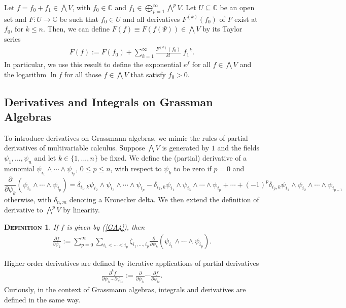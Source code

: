 \documentclass[12pt,twoside]{amsart}
\newcommand{\beq}{\begin{equation}}
\newcommand{\eeq}{\end{equation}}
\newtheorem{defi}{\textsc{Definition}}[section]
\numberwithin{equation}{section}
\begin{document}
Let $f = f_{0}+ f_{1} \in \bigwedge V$, with $f_{0} \in \mathbb{C}$ and $f_{1} \in \bigoplus_{p=1}^{\infty}\bigwedge^{p}V$. Let $U \subseteq \mathbb{C}$ be an open set and $F: U \to \mathbb{C}$ be such that $f_{0} \in U$ and all derivatives $F^{(k)}(f_{0})$ of $F$ exist at $f_{0}$, for $k \le n$. Then, we can define $F(f) \equiv F(f(\Psi)) \in \bigwedge V$ by its Taylor series
\begin{eqnarray}
F(f) := F(f_{0}) + \sum_{k=1}^{\infty}\frac{F^{(k)}(f_{0})}{k!}\;{f_1}^{k}. \label{GA8}
\end{eqnarray}
In particular, we use this result to define the exponential $e^{f}$ for all $f \in \bigwedge V$ and the logarithm $\ln f$ for all those $f \in \bigwedge V$ that satisfy $f_0 > 0$. 

\subsection{Derivatives and Integrals on Grassman Algebras}\label{derivativesandintegrals}

To introduce derivatives on Grassmann algebras, we mimic the rules of partial derivatives of multivariable calculus. Suppose $\bigwedge V$ is generated by $1$ and the fields $\psi_{1},...,\psi_{n}$ and let $k \in \{1,...,n\}$ be fixed. We define the (partial) derivative of a monomial $\psi_{i_{1}}\wedge \cdots \wedge \psi_{i_{p}}$, $0 \le p \le n$, with respect to $\psi_{k}$ to be zero if $p=0$ and 
\beq
\frac{\partial}{\partial \psi_{k}}(\psi_{i_{1}}\wedge \cdots \wedge \psi_{i_{p}}) = \delta_{i_{1},k}\psi_{i_{2}}\wedge \psi_{i_{3}}\wedge  \cdots \wedge \psi_{i_{p}} -\delta_{i_{2},k}\psi_{i_{1}}\wedge \psi_{i_{3}}\wedge \cdots \wedge \psi_{i_{p}}+\cdots +(-1)^{p}\delta_{i_{p},k}\psi_{i_{1}}\wedge \psi_{i_{2}}\wedge \cdots \wedge \psi_{i_{p-1}} \label{GA11}
\eeq
otherwise, with $\delta_{n,m}$ denoting a Kronecker delta. We then extend the definition of derivative to $\bigwedge^{p}V$ by linearity.

\begin{defi}\label{derivativeswedge} If $f$ is given by (\ref{GA4}), then
\begin{eqnarray}
\frac{\partial f}{\partial \psi_{k}} := \sum_{p=0}^{\infty}\sum_{i_{1}<\cdots < i_{p}}\zeta_{i_{1},...,i_{p}}\frac{\partial}{\partial \psi_{k}}(\psi_{i_{1}}\wedge \cdots \wedge \psi_{i_{p}}). \label{GA13}
\end{eqnarray}
\end{defi}

Higher order derivatives are defined by iterative applications of partial derivatives
\begin{eqnarray}
\frac{\partial^{k}f}{\partial{\psi_{i_{1}}\cdots \partial \psi_{i_{k}}}} := \frac{\partial}{\partial \psi_{i_{1}}}\cdots \frac{\partial f}{\partial \psi_{i_{k}}}. \label{GA14}
\end{eqnarray}
Curiously, in the context of Grassmann algebras, integrals and derivatives are defined in the same way.
\end{document}
